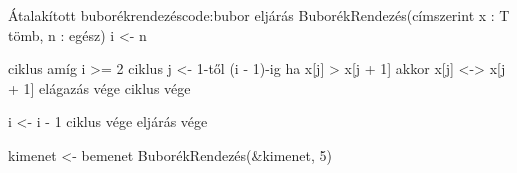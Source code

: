 \begin{code}{Átalakított buborékrendezés}{code:bubor}
eljárás BuborékRendezés(címszerint x : T tömb, n : egész)
    i <- n

    ciklus amíg i >= 2
        ciklus j <- 1-től (i - 1)-ig
            ha x[j] > x[j + 1] akkor
                x[j] <-> x[j + 1]
            elágazás vége
        ciklus vége

        i <- i - 1
    ciklus vége
eljárás vége

kimenet <- bemenet
BuborékRendezés(&kimenet, 5)
\end{code}
